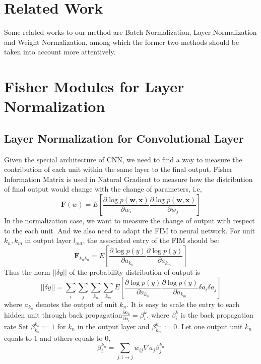 \documentclass{sig-alternate}
\begin{document}
\section{Related Work}
    Some related works to our method are Batch Normalization, Layer Normalization and Weight Normalization, among which the former two methods should be taken into account more attentively.
\section{Fisher Modules for Layer Normalization}
    \subsection{Layer Normalization for Convolutional Layer}
    Given the special architecture of CNN, we need to find a way to measure the contribution of each unit within the same layer to the final output. Fisher Information Matrix is used in Natural Gradient to measure how the distribution of final output would change with the change of parameters, i.e, 
    \begin{displaymath}\pmb{F}(w)=E[\frac{\partial\log p(\pmb{w,x})}{\partial w_i}\frac{\partial\log p(\pmb{w,x})}{\partial w_j}] 
    \end{displaymath}
    In the normalization case, we want to measure the change of output with respect to the each unit. And we also need to adapt the FIM to neural network. For unit $k_n, k_m$ in output layer $l_{out}$, the associated entry of the FIM should be:
    \begin{equation}
        \pmb{F}_{k_nk_n} = E[\frac{\partial\log p(y)}{\partial a_{k_n}}\frac{\partial\log p(y)}{\partial a_{k_m}}]
    \end{equation}
    Thus the norm $||\delta y||$ of the probability distribution of output is 
    \begin{equation}
        ||\delta y|| = \sum_i\sum_j\sum_{k_n}\sum_{k_m}E[\frac{\partial\log p(y)}{\partial a_{k_n}}\frac{\partial\log p(y)}{\partial a_{k_m}}\delta a_i\delta a_j]
    \end{equation}
    where $a_{k_n}$ denotes the output of unit $k_n$.
    It is easy to scale the entry to each hidden unit through back propagation$\frac{\partial a_k}{\partial a_i}=\beta_i^{k}$.
    where $\beta_i^{k}$ is the back propagation rate\cite{LeCun1998}
    Set $\beta_{k_n}^{k_n}:=1$ for $k_n$ in the output layer and $\beta_{k_m}^{k_m}:=0$. Let one output unit $k_n$ equals to 1 and others equals to 0, 
    \begin{equation}
        \beta_{i}^{k_n} = \sum_{j, i\rightarrow j}w_{ij}\nabla a_j \beta_j^{k_n} 
    \end{equation}
\end{document}
